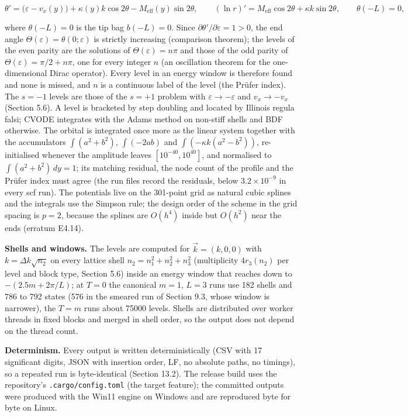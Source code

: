 \documentclass[11pt]{article}
\begin{document}
\[
\theta'=\bigl(\varepsilon-v_x(y)\bigr)+\kappa(y)k\cos2\theta-M_{\mathrm{eff}}(y)\sin2\theta,\qquad(\ln r)'=M_{\mathrm{eff}}\cos2\theta+\kappa k\sin2\theta,\qquad\theta(-L)=0,
\]

where $\theta(-L)=0$ is the tip bag $b(-L)=0$. Since $\partial\theta'/\partial\varepsilon=1>0$, the end angle $\Theta(\varepsilon)=\theta(0;\varepsilon)$ is strictly increasing (comparison theorem); the levels of the even parity are the solutions of $\Theta(\varepsilon)=n\pi$ and those of the odd parity of $\Theta(\varepsilon)=\pi/2+n\pi$, one for every integer $n$ (an oscillation theorem for the one-dimensional Dirac operator). Every level in an energy window is therefore found and none is missed, and $n$ is a continuous label of the level (the Prüfer index). The $s=-1$ levels are those of the $s=+1$ problem with $\varepsilon\to-\varepsilon$ and $v_x\to-v_x$ (Section 5.6). A level is bracketed by step doubling and located by Illinois regula falsi; CVODE integrates with the Adams method on non-stiff shells and BDF otherwise. The orbital is integrated once more as the linear system together with the accumulators $\int(a^2+b^2)$, $\int(-2ab)$ and $\int(-\kappa k(a^2-b^2))$, re-initialised whenever the amplitude leaves $[10^{-40},10^{40}]$, and normalised to $\int(a^2+b^2)\,dy=1$; its matching residual, the node count of the profile and the Prüfer index must agree (the run files record the residuals, below $3.2\times10^{-9}$ in every scf run). The potentials live on the 301-point grid as natural cubic splines and the integrals use the Simpson rule; the design order of the scheme in the grid spacing is $p=2$, because the splines are $O(h^4)$ inside but $O(h^2)$ near the ends (erratum E4.14).

\textbf{Shells and windows.} The levels are computed for $\vec k=(k,0,0)$ with $k=\Delta k\sqrt{n_2}$ on every lattice shell $n_2=n_1^2+n_2^2+n_3^2$ (multiplicity $4r_3(n_2)$ per level and block type, Section 5.6) inside an energy window that reaches down to $-(2.5m+2\pi/L)$; at $T=0$ the canonical $m=1$, $L=3$ runs use 182 shells and 786 to 792 states (576 in the smeared run of Section 9.3, whose window is narrower), the $T=m$ runs about 75000 levels. Shells are distributed over worker threads in fixed blocks and merged in shell order, so the output does not depend on the thread count.

\textbf{Determinism.} Every output is written deterministically (CSV with 17 significant digits, JSON with insertion order, LF, no absolute paths, no timings), so a repeated run is byte-identical (Section 13.2). The release build uses the repository's \texttt{.cargo/c\allowbreak{}onfig.to\allowbreak{}ml} (the \texttt{} target feature); the committed outputs were produced with the Win11 engine on Windows and are reproduced byte for byte on Linux.
\end{document}
